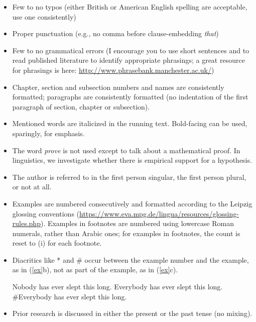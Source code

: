 \documentclass[11pt,fleqn,a4paper/thesis]{article}
\def\infelic{{\leavevmode\llap{\#}}}
\newcommand{\6}{\mbox{$[\hspace*{-.6mm}[$}}
\newcommand{\9}{\mbox{$]\hspace*{-.6mm}]$}}
\begin{document}
\begin{itemize}[itemsep=-1pt,leftmargin=2.5ex,topsep=-2pt]
\item Few to no typos (either British or American English spelling are acceptable, use one consistently)

\item Proper punctuation (e.g., no comma before clause-embedding {\em that})

\item Few to no grammatical errors (I encourage you to use short sentences and to read published literature to identify appropriate phrasings; a great resource for phrasings is here: \url{http://www.phrasebank.manchester.ac.uk/})

\item Chapter, section and subsection numbers and names are consistently formatted; paragraphs are consistently formatted (no indentation of the first paragraph of section, chapter or subsection).

\item Mentioned words are italicized in the running text. Bold-facing can be used, sparingly, for emphasis.

\item The word {\em prove} is not used except to talk about a mathematical proof. In linguistics, we investigate whether there is empirical support for a hypothesis. 

\item The author is referred to in the first person singular, the first person plural, or not at all.

\item Examples are numbered consecutively and formatted according to the Leipzig glossing conventions (\url{https://www.eva.mpg.de/lingua/resources/glossing-rules.php}). Examples in footnotes are numbered using lowercase Roman numerals, rather than Arabic ones; for examples in footnotes, the count is reset to (i) for each footnote.

\item Diacritics like * and \# occur between the example number and the example, as in (\ref{ex}b), not as part of the example, as in (\ref{ex}c).

\begin{exe}
\ex\label{ex}
\begin{xlist}
\ex Nobody has ever slept this long.
\ex \infelic Everybody has ever slept this long.
\ex \#Everybody has ever slept this long.
\end{xlist}
\end{exe}

\item Prior research is discussed in either the present or the past tense (no mixing).


\end{itemize}
\end{document}
